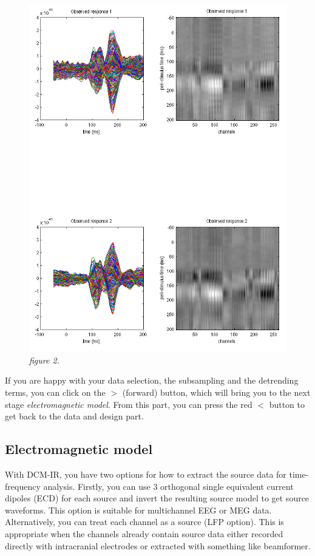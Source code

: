 \begin{figure}
\begin{center}
\includegraphics[width=160mm]{dcm_ir/figures/figure2}
\caption{\em  figure 2. \label{dcm-ir:fig:2}}
\end{center}
\end{figure}

If you are happy with your data selection, the subsampling and the detrending terms, you can click on the $>$ (forward) button, which will bring you to the next stage \textit{electromagnetic model}. From this part, you can press the red $<$ button to get back to the data and design part.

\subsection{Electromagnetic model}
With DCM-IR, you have two options for how to extract the source data for time-frequency analysis. Firstly, you can use 3 orthogonal single equivalent current dipoles (ECD) for each source and invert the resulting source model to get source waveforms. This option is suitable for multichannel EEG or MEG data. Alternatively, you can treat each channel as a source (LFP option). This is appropriate when the channels already contain source data either recorded directly with intracranial electrodes or extracted with something like beamformer. 

